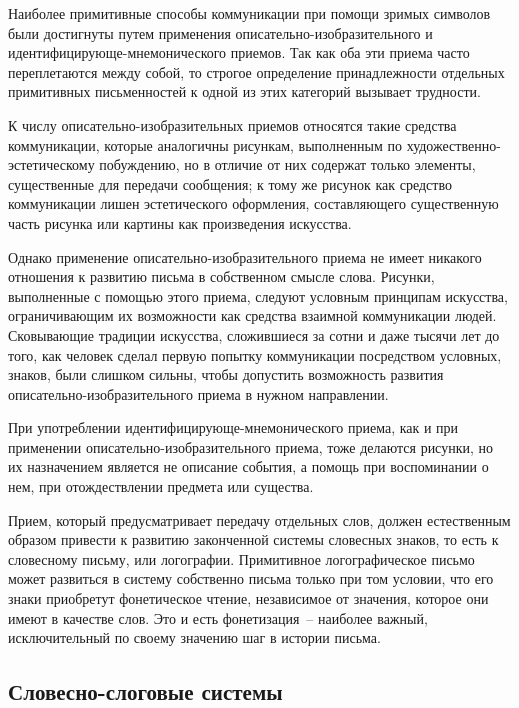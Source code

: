   Наиболее примитивные способы коммуникации при помощи зримых символов были
  достигнуты путем применения описательно-изобразительного и
  идентифицирующе-мнемонического приемов. Так как оба эти приема часто
  переплетаются между собой, то строгое определение принадлежности отдельных
  примитивных письменностей к одной из этих категорий вызывает трудности.
  
  К числу описательно-изобразительных приемов относятся такие средства
  коммуникации, которые аналогичны рисункам, выполненным по
  художественно-эстетическому побуждению, но в отличие от них содержат только
  элементы, существенные для передачи сообщения; к тому же рисунок как средство
  коммуникации лишен эстетического оформления, составляющего существенную часть
  рисунка или картины как произведения искусства.
  
  Однако применение описательно-изобразительного приема не имеет никакого
  отношения к развитию письма в собственном смысле слова. Рисунки, выполненные
  с помощью этого приема, следуют условным принципам искусства, ограничивающим
  их возможности как средства взаимной коммуникации людей. Сковывающие традиции
  искусства, сложившиеся за сотни и даже тысячи лет до того, как человек сделал
  первую попытку коммуникации посредством условных, знаков, были слишком
  сильны, чтобы допустить возможность развития описательно-изобразительного
  приема в нужном направлении.
  
  При употреблении идентифицирующе-мнемонического приема, как и при применении
  описательно-изобразительного приема, тоже делаются рисунки, но их назначением
  является не описание события, а помощь при воспоминании о нем, при
  отождествлении предмета или существа.
  
  Прием, который предусматривает передачу отдельных слов, должен естественным
  образом привести к развитию законченной системы словесных знаков, то есть к
  словесному письму, или логографии. Примитивное логографическое письмо может
  развиться в систему собственно письма только при том условии, что его знаки
  приобретут фонетическое чтение, независимое от значения, которое они имеют в
  качестве слов. Это и есть фонетизация~-- наиболее важный, исключительный по
  своему значению шаг в истории письма.
  
  \subsection{Словесно-слоговые системы}
  
